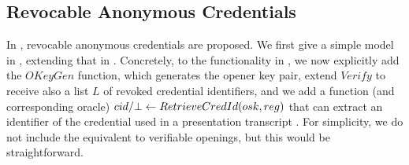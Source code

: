 \subsection{Revocable Anonymous Credentials}
\label{ssec:related-models-rac}

In \cite{cks10,ckl+15}, revocable anonymous credentials are proposed. We first
give a simple model in , extending that in
. Concretely, to the functionality in
, we now explicitly add the $OKeyGen$ function,
which generates the opener key pair, extend $Verify$ to receive also a list $L$
of revoked credential identifiers, and we add a function (and corresponding
oracle) $cid/\bot \gets RetrieveCredId(osk,reg)$ that can extract an
identifier of the credential used in a presentation transcript \utrans. For
simplicity, we do not include the equivalent to verifiable openings, but this
would be straightforward.

